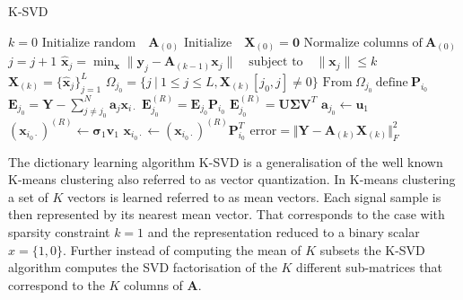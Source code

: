 \begin{algorithm}[H]
\caption{K-SVD}
\begin{algorithmic}[1]
			\State$k = 0$			
			\State$\text{Initialize random} \quad  \textbf{A}_{(0)}$            
			\State$\text{Initialize} \quad \textbf{X}_{(0)}=\mathbf{0}$
			\State
            \State$\text{Normalize columns of} \ \textbf{A}_{(0)}$
                \State $j = j+1$
                 
                	\State$\hat{\textbf{x}}_{j} = \min_{\textbf{x}} \|\textbf{y}_j -\textbf{A}_{(k-1)}\textbf{x}_{j}\| \quad \text{subject to} \quad \|\textbf{x}_{j}\| \leq k $ 
				\EndFor
				\State$\textbf{X}_{(k)} = \lbrace \hat{\textbf{x}}_{j} \rbrace_{j=1}^{L}$
					\State$\Omega_{j_0} = \lbrace j \ \vert \ 1 \leq j \leq L, \textbf{X}_{(k)} [j_0, j]\neq 0\rbrace$
					\State$\text{From} \ \Omega_{j_0} \ \text{define} \ \textbf{P}_{i_0} $
					\State$\textbf{E}_{j_0} =  \textbf{Y} - \sum_{j \neq j_{0}}^{N} \textbf{a}_j \textbf{x}_{i \cdot}$
					\State$\textbf{E}_{j_0}^{(R)} =  \textbf{E}_{j_0} \textbf{P}_{i_0}$
					\State$\textbf{E}_{j_0}^{(R)} =\textbf{U} \boldsymbol{\Sigma} \textbf{V}^T$ 
					\State$\textbf{a}_{j_0} \gets \textbf{u}_{1}$ 
					\State$\left( \textbf{x}_{i_0 \cdot} \right)^{(R)} \gets \boldsymbol{\sigma}_{1} \textbf{v}_{1}$
					\State$\textbf{x}_{i_0 \cdot} \gets \left( \textbf{x}_{i_0 \cdot} \right)^{(R)} \textbf{P}_{i_0}^T $ 
				\EndFor
				\State$\text{error} = \Vert \textbf{Y} - \textbf{A}_{(k)} \textbf{X}_{(k)} \Vert_{F}^2 $
          		\EndWhile
            \EndProcedure
        \end{algorithmic} 
        \label{alg:K_SVD}
\end{algorithm}
The dictionary learning algorithm K-SVD is a generalisation of the well known K-means clustering also referred to as vector quantization. In K-means clustering a set of $K$ vectors is learned referred to as mean vectors. Each signal sample is then represented by its nearest mean vector. That corresponds to the case with sparsity constraint $k = 1$ and the representation reduced to a binary scalar $x = \lbrace 1, 0 \rbrace$. Further instead of computing the mean of $K$ subsets the K-SVD algorithm computes the SVD factorisation of the $K$ different sub-matrices that correspond to the $K$ columns of $\textbf{A}$.
